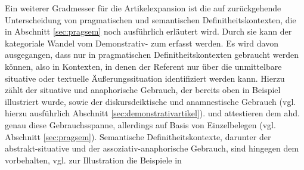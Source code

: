 Ein weiterer Gradmesser für die Artikelexpansion  ist die auf \textcite{Lobner1985,Lobner1998} zurückgehende Unterscheidung   von pragmatischen  und semantischen   Definitheitskontexten,  die in Abschnitt \ref{sec:pragsem} noch ausführlich erläutert wird. Durch sie kann der kategoriale Wandel vom Demonstrativ-  zum  erfasst werden. Es wird davon ausgegangen, dass  nur in pragmatischen Definitheitskontexten  gebraucht werden können, also in Kontexten, in denen der Referent nur über die unmittelbare situative oder textuelle Äußerungssituation identifiziert werden kann. Hierzu zählt der situative  und anaphorische  Gebrauch, der bereits oben in Beispiel  illustriert wurde, sowie der diskursdeiktische  und anamnestische  Gebrauch (vgl. hierzu ausführlich Abschnitt \ref{sec:demonstrativartikel}). \textcite[84--88]{Philippi1997} und \textcite[112--117]{Demske2001} attestieren dem ahd.  genau diese Gebrauchsspanne, allerdings auf Basis von Einzelbelegen (vgl. Abschnitt \ref{sec:pragsem}). Semantische Definitheitskontexte,  darunter der abstrakt-situative  und der assoziativ-anaphorische  Gebrauch, sind hingegen dem  vorbehalten, vgl. zur Illustration die Beispiele in 

